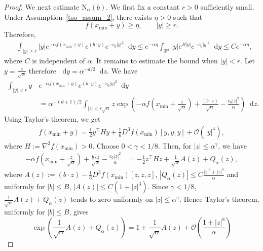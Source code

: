 \documentclass[10pt,a4paper]{amsart}
\newcommand*\der{\mathop{}\!\mathrm{d}}
\begin{document}
\begin{proof}
We next estimate $\mathrm{N}_\alpha(b)$. We first fix a constant $r>0$ sufficiently small. Under Assumption~\ref{tso_assum_2}, there exists $\eta>0$ such that
\begin{equation*}
    f(x_{\min}+y)\ge \eta,
    \qquad |y|\ge r.
\end{equation*}
Therefore, 
\begin{align}\label{tso_eqn_2.31}
    &\int_{|y|\ge r}
    |y|e^{-\alpha f(x_{\min}+y)}
    e^{(b\cdot y)}
    e^{-c_0|y|^2}
    \der y \leq
    e^{-\alpha\eta}
    \int_{\mathbb R^d}
    |y|e^{B|y|}e^{-c_0|y|^2}\der y
    \leq    Ce^{-\alpha\eta},
\end{align}
where $C$ is independent of $\alpha$. It remains to estimate the bound when  $|y|<r$.   Let $y = \frac{z}{\sqrt{\alpha}}$ therefore $\der y = \alpha^{-d/2} \der z $. 
We have 
\begin{align}
    \int_{|y|<r}
    y\,&e^{-\alpha f(x_{\min}+y)}
    e^{(b\cdot y)}
    e^{-c_0|y|^2}
    \der y     \nonumber \\  & =  \alpha^{-(d+1)/2}
    \int_{|z|<r\sqrt{\alpha}} z    \exp\left(
        -\alpha f\left(x_{\min}+\frac{z}{\sqrt{\alpha}}\right)+
        \frac{(b\cdot z)}{\sqrt{\alpha}} - \frac{c_0|z|^2}{\alpha}
    \right)\der z. 
    \end{align}
    Using Taylor's theorem, we get
\begin{align}
f(x_{\min}+y) = \frac{1}{2} y^\top H y + \frac{1}{6} D^3 f(x_{\min})[y,y,y] + \mathcal{O}(|y|^4),
\end{align}
where $
    H:=\nabla^2 f(x_{\min})>0$. Choose $0<\gamma<1/8$. Then, for $|z|\le \alpha^\gamma$, we have
\begin{align*}
    -\alpha f\left(x_{\min}+\frac z{\sqrt\alpha}\right) + \frac{b\cdot z}{\sqrt\alpha} -
    \frac{c_0|z|^2}{\alpha}
    &=  -\frac{1}{2} z^\top H z
    +  \frac{1}{\sqrt\alpha}A(z)
    + Q_\alpha(z),
\end{align*}
where $ A(z)
    := (b\cdot z) - \frac{1}{6} D^3f(x_{\min})[z,z,z]$, $|Q_\alpha(z)| \leq C\frac{|z|^2+|z|^4}{\alpha}$ and uniformly for $|b|\le B$, $|A(z)|\le C(1+|z|^3)$. Since $\gamma<1/8$, $\frac{1}{\sqrt\alpha}A(z) + Q_\alpha(z)$
tends to zero uniformly on $|z|\leq \alpha^\gamma$. Hence Taylor's theorem, uniformly for \(|b|\le B\), gives
\begin{equation}\label{tso_eqn_3.31}
    \exp\left(
        \frac1{\sqrt\alpha}A(z)+Q_\alpha(z)
    \right) = 1 + \frac{1}{\sqrt\alpha}A(z) +    \mathcal{O}\left(\frac{1+|z|^8}{\alpha}\right)
\end{equation}

\end{proof}
\end{document}
